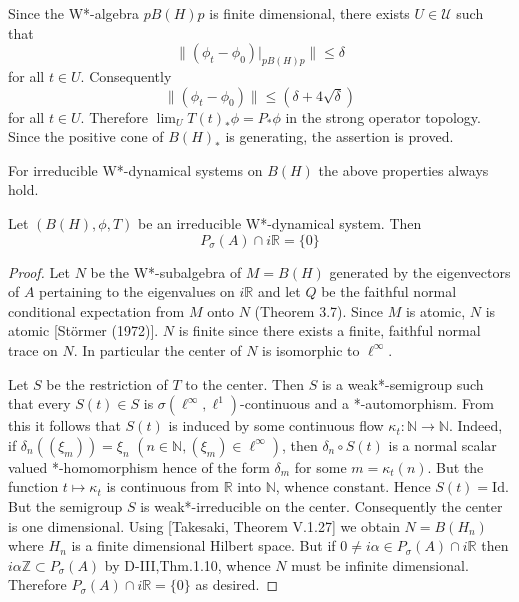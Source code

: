 Since the W*-algebra \(pB(H)p\) is finite dimensional, there exists \(U \in \mathcal{U}\) such that
\[
\|(\phi_{t} - \phi_{0})|_{pB(H)p}\| \leq \delta
\]
for all \(t \in U\).
Consequently
\[
\|(\phi_{t} - \phi_{0})\| \leq (\delta + 4\sqrt{\delta})
\]
for all \(t \in U\).
Therefore \(\lim_{U} T(t)_{*}\phi = P_{*}\phi\) in the strong operator topology.
Since the positive cone of \(B(H)_{*}\) is generating, the assertion is proved.

For irreducible W*-dynamical systems on \(B(H)\) the above properties always hold.

\begin{theorem}\label{thm:d4-3-8}
Let \((B(H),\phi,T)\) be an irreducible W*-dynamical system.
Then
\[
P_{\sigma}(A) \cap i\mathbb{R} = \{0\}
\]
\end{theorem}

\newpage

\begin{proof}
Let \(N\) be the W*-subalgebra of \(M = B(H)\) generated by the eigenvectors of \(A\) pertaining to the eigenvalues on \(i\mathbb{R}\) and let \(Q\) be the faithful normal conditional expectation from \(M\) onto \(N\) (Theorem 3.7).
Since \(M\) is atomic, \(N\) is atomic [Störmer (1972)].
\(N\) is finite since there exists a finite, faithful normal trace on \(N\).
In particular the center of \(N\) is isomorphic to \(\ell^{\infty}\).

Let \(S\) be the restriction of \(T\) to the center.
Then \(S\) is a weak*-semigroup such that every \(S(t) \in S\) is \(\sigma(\ell^{\infty},\ell^{1})\)-continuous and a *-automorphism.
From this it follows that \(S(t)\) is induced by some continuous flow \(\kappa_{t}: \mathbb{N} \to \mathbb{N}\).
Indeed, if \(\delta_{n}((\xi_{m})) = \xi_{n}\) \((n \in \mathbb{N}, (\xi_{m}) \in \ell^{\infty})\), then \(\delta_{n} \circ S(t)\) is a normal scalar valued *-homomorphism hence of the form \(\delta_{m}\) for some \(m = \kappa_{t}(n)\).
But the function \(t \mapsto \kappa_{t}\) is continuous from \(\mathbb{R}\) into \(\mathbb{N}\), whence constant.
Hence \(S(t) = \text{Id}\).
But the semigroup \(S\) is weak*-irreducible on the center.
Consequently the center is one dimensional.
Using [Takesaki, Theorem V.1.27] we obtain \(N = B(H_{n})\) where \(H_{n}\) is a finite dimensional Hilbert space.
But if \(0 \neq i\alpha \in P_{\sigma}(A) \cap i\mathbb{R}\) then \(i\alpha\mathbb{Z} \subset P_{\sigma}(A)\) by D-III,Thm.1.10, whence \(N\) must be infinite dimensional.
Therefore \(P_{\sigma}(A) \cap i\mathbb{R} = \{0\}\) as desired.
\end{proof}

